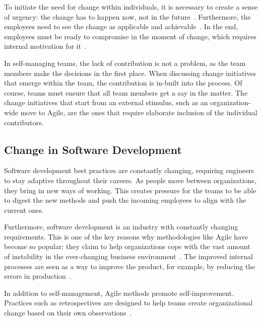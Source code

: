 To initiate the need for change within individuals, it is necessary to create a sense of urgency: the change has to happen now, not in the future~\cite{lenberg_initial_2017}. Furthermore, the employees need to see the change as applicable and achievable~\cite{kotter_leading_1995}. In the end, employees must be ready to compromise in the moment of change, which requires internal motivation for it~\cite{rehman_psychology_2021}. 

In self-managing teams, the lack of contribution is not a problem, as the team members make the decisions in the first place. When discussing change initiatives that emerge within the team, the contribution is in-built into the process. Of course, teams must ensure that all team members get a say in the matter. The change initiatives that start from an external stimulus, such as an organization-wide move to Agile, are the ones that require elaborate inclusion of the individual contributors. 

\subsection{Change in Software Development}

Software development best practices are constantly changing, requiring engineers to stay adaptive throughout their careers. As people move between organizations, they bring in new ways of working. This creates pressure for the teams to be able to digest the new methods and push the incoming employees to align with the current ones. 

Furthermore, software development is an industry with constantly changing requirements. This is one of the key reasons why methodologies like Agile have become so popular: they claim to help organizations cope with the vast amount of instability in the ever-changing business environment~\cite{hamed_popular_2013}. The improved internal processes are seen as a way to improve the product, for example, by reducing the errors in production~\cite{cugola_software_1998}.

In addition to self-management, Agile methods promote self-im\-prove\-ment. Practices such as retrospectives are designed to help teams create organizational change based on their own observations~\cite{derby_agile_2006}. 